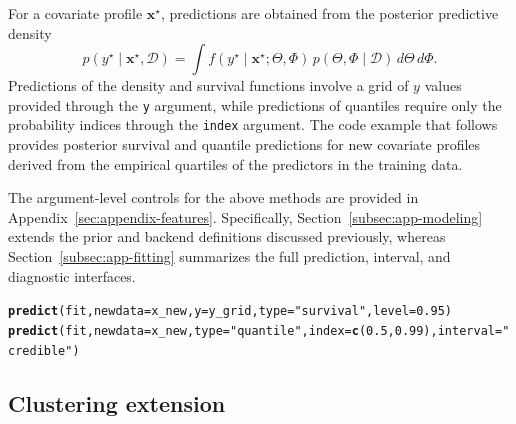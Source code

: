 \documentclass[article]{jss}\usepackage[]{graphicx}\usepackage[]{xcolor}
\makeatletter
\newcommand{\hlnum}[1]{\textcolor[rgb]{0.686,0.059,0.569}{#1}}%
\newcommand{\hlsng}[1]{\textcolor[rgb]{0.192,0.494,0.8}{#1}}%
\newcommand{\hldef}[1]{\textcolor[rgb]{0.345,0.345,0.345}{#1}}%
\newcommand{\hlkwc}[1]{\textcolor[rgb]{0.333,0.667,0.333}{#1}}%
\newcommand{\hlkwd}[1]{\textcolor[rgb]{0.737,0.353,0.396}{\textbf{#1}}}%
\newenvironment{kframe}{%
 \def\at@end@of@kframe{}%
 \ifinner\ifhmode%
  \def\at@end@of@kframe{\end{minipage}}%
  \begin{minipage}{\columnwidth}%
 \fi\fi%
 \def\FrameCommand##1{\hskip\@totalleftmargin \hskip-\fboxsep
 \colorbox{shadecolor}{##1}\hskip-\fboxsep
     \hskip-\linewidth \hskip-\@totalleftmargin \hskip\columnwidth}%
 \MakeFramed {\advance\hsize-\width
   \@totalleftmargin\z@ \linewidth\hsize
   \@setminipage}}%
 {\par\unskip\endMakeFramed%
 \at@end@of@kframe}
\newenvironment{knitrout}{}{} %
\DeclareRobustCommand{\code}[1]{\nolinkurl{#1}}
\makeatother
\begin{document}
For a covariate profile $\boldsymbol{x}^\star$, predictions are obtained from the
posterior predictive density
\begin{equation*}
p(y^\star\mid \boldsymbol{x}^\star, \mathcal{D})
=\int f(y^\star\mid \boldsymbol{x}^\star; \Theta, \Phi)\,p(\Theta, \Phi\mid \mathcal{D})\,d\Theta\,d\Phi.
\end{equation*}
Predictions of the density and survival functions involve a grid of $y$
values provided through the \code{y} argument, while predictions of quantiles
require only the probability indices through the \code{index} argument.
The code example that follows provides posterior survival and quantile
predictions for new covariate profiles derived from the empirical
quartiles of the predictors in the training data.

The argument-level controls for the above methods are provided in
Appendix~\ref{sec:appendix-features}. Specifically,
Section~\ref{subsec:app-modeling} extends the prior and backend
definitions discussed previously, whereas Section~\ref{subsec:app-fitting} summarizes the full prediction,
interval, and diagnostic interfaces.

\begin{knitrout}\footnotesize
{}\color{fgcolor}\begin{kframe}
\begin{alltt}
\hlkwd{predict}\hldef{(fit,} \hlkwc{newdata} \hldef{= x_new,} \hlkwc{y} \hldef{= y_grid,} \hlkwc{type} \hldef{=} \hlsng{"survival"}\hldef{,} \hlkwc{level} \hldef{=} \hlnum{0.95}\hldef{)}
\hlkwd{predict}\hldef{(fit,} \hlkwc{newdata} \hldef{= x_new,} \hlkwc{type} \hldef{=} \hlsng{"quantile"}\hldef{,} \hlkwc{index} \hldef{=} \hlkwd{c}\hldef{(}\hlnum{0.5}\hldef{,} \hlnum{0.99}\hldef{),} \hlkwc{interval} \hldef{=} \hlsng{"credible"}\hldef{)}
\end{alltt}
\end{kframe}
\end{knitrout}



\subsection{Clustering extension}
\label{subsec:cluster_extension}
\end{document}
